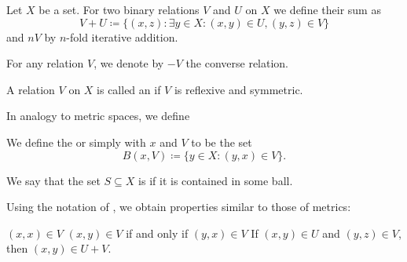 \begin{definition}\label{def:entourage}\cite[section 8.1]{Engelking1989}
  Let \( X \) be a set. For two binary relations \( V \) and \( U \) on \( X \) we define their sum as
  \begin{equation*}
    V + U \coloneqq \{ (x, z) \colon \exists y \in X: (x, y) \in U, (y, z) \in V \}
  \end{equation*}
  and \( nV \) by \( n \)-fold iterative addition.

  For any relation \( V \), we denote by \( -V \) the converse relation.

  A relation \( V \) on \( X \) is called an  if \( V \) is reflexive and symmetric.

  In analogy to metric spaces, we define
  \begin{defenum}
     We define the  or simply  with  \( x \) and  \( V \) to be the set
    \begin{equation*}
      B(x, V) \coloneqq \{ y \in X \colon (y, x) \in V \}.
    \end{equation*}

     We say that the set \( S \subseteq X \) is  if it is contained in some ball.
  \end{defenum}
\end{definition}

\begin{proposition}\label{thm:entourage_simulates_metric}\cite[section 8.1]{Engelking1989}
  Using the notation of , we obtain properties similar to those of metrics:
  \begin{description}
     \( (x, x) \in V \)
     \( (x, y) \in V \) if and only if \( (y, x) \in V \)
     If \( (x, y) \in U \) and \( (y, z) \in V \), then \( (x, y) \in U + V \).
  \end{description}
\end{proposition}

